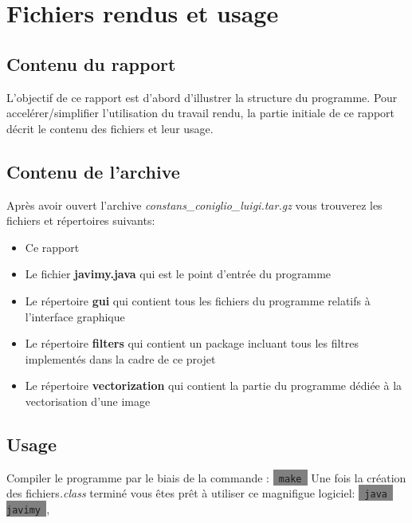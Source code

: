 \documentclass[twoside,openright,a4paper,11pt,french]{article}
\begin{document}
\pagestyle{plain}
\setlength{\parindent}{0pt}



\parskip=0pt
\tableofcontents


\vspace{5cm}


\section{Fichiers rendus et usage}
\subsection{Contenu du rapport}
L'objectif de ce rapport est d'abord d'illustrer la structure du
programme. Pour accelérer/simplifier l'utilisation du travail rendu, la partie
initiale de ce rapport décrit le contenu des fichiers et leur usage.

\subsection{Contenu de l'archive}
Après avoir ouvert l'archive {\it constans\_coniglio\_luigi.tar.gz} vous
trouverez les fichiers et répertoires suivants:
\smallbreak
\begin{itemize}
\item Ce rapport
\item Le fichier {\bf javimy.java} qui est le point d'entrée du programme
\item Le répertoire {\bf gui} qui contient tous les fichiers du programme relatifs
      à l'interface graphique
\item Le répertoire {\bf filters} qui contient un package incluant tous les filtres 
      implementés dans la cadre de ce projet
\item Le répertoire {\bf vectorization} qui contient la partie du programme dédiée à
      la vectorisation d'une image
\end{itemize}

\bigbreak
\subsection{Usage}
Compiler le programme par le biais de la commande : 
\colorbox{gray}{\lstinline[basicstyle=\ttfamily\color{black}]| make |}
Une fois la création des fichiers{\it .class} terminé vous êtes prêt
à utiliser ce magnifigue logiciel: 
\colorbox{gray}{\lstinline[basicstyle=\ttfamily\color{black}]| java javimy |},
\end{document}
